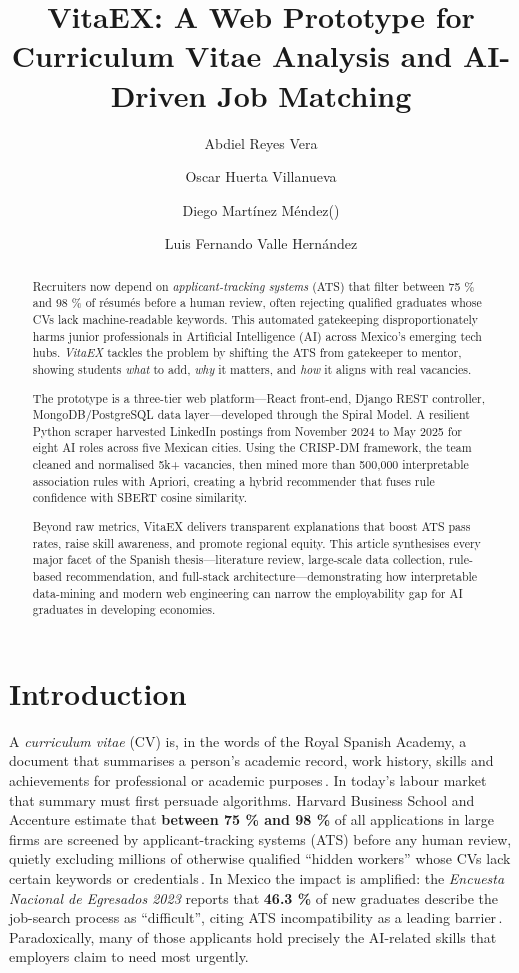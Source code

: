 \documentclass[runningheads]{llncs}
\title{VitaEX: A Web Prototype for Curriculum Vitae Analysis and AI-Driven Job Matching}
\author{
	Abdiel Reyes Vera\inst{1,2} \and
	Oscar Huerta Villanueva\inst{1} \and
	Diego Martínez Méndez\inst{1}(\Letter) \and 
	Luis Fernando Valle Hernández\inst{1} 
}
\institute{
	Escuela Superior de Cómputo, IPN, Mexico City, Mexico \\
	\texttt{\Letter~dmartinezm1707@alumno.ipn.mx} 
	\and
	Centro de Investigación en Computación, IPN, Mexico City, Mexico
}
\begin{document}
	\maketitle
	
\begin{abstract}
	Recruiters now depend on \emph{applicant-tracking systems} (ATS) that filter between 75 \% and 98 \% of résumés before a human review, often rejecting qualified graduates whose CVs lack machine-readable keywords. This automated gatekeeping disproportionately harms junior professionals in Artificial Intelligence (AI) across Mexico’s emerging tech hubs. \textit{VitaEX} tackles the problem by shifting the ATS from gatekeeper to mentor, showing students \emph{what} to add, \emph{why} it matters, and \emph{how} it aligns with real vacancies.
	
	The prototype is a three-tier web platform—React front-end, Django REST controller, MongoDB/PostgreSQL data layer—developed through the Spiral Model. A resilient Python scraper harvested LinkedIn postings from November 2024 to May 2025 for eight AI roles across five Mexican cities. Using the CRISP-DM framework, the team cleaned and normalised 5k+ vacancies, then mined more than 500,000 interpretable association rules with Apriori, creating a hybrid recommender that fuses rule confidence with SBERT cosine similarity.
	
	Beyond raw metrics, VitaEX delivers transparent explanations that boost ATS pass rates, raise skill awareness, and promote regional equity. This article synthesises every major facet of the Spanish thesis—literature review, large-scale data collection, rule-based recommendation, and full-stack architecture—demonstrating how interpretable data-mining and modern web engineering can narrow the employability gap for AI graduates in developing economies.
\end{abstract}

	

	
\section{Introduction}
A \emph{curriculum vitae} (CV) is, in the words of the Royal Spanish Academy, a document that summarises a person’s academic record, work history, skills and achievements for professional or academic purposes\,\cite{rae}.  
In today’s labour market that summary must first persuade algorithms.  
Harvard Business School and Accenture estimate that \textbf{between 75 \% and 98 \%} of all applications in large firms are screened by applicant-tracking systems (ATS) before any human review, quietly excluding millions of otherwise qualified “hidden workers” whose CVs lack certain keywords or credentials\,\cite{ats1}.  
In Mexico the impact is amplified: the \emph{Encuesta Nacional de Egresados 2023} reports that \textbf{46.3 \%} of new graduates describe the job-search process as “difficult”, citing ATS incompatibility as a leading barrier\,\cite{uvm2023}.  
Paradoxically, many of those applicants hold precisely the AI-related skills that employers claim to need most urgently.
\end{document}
